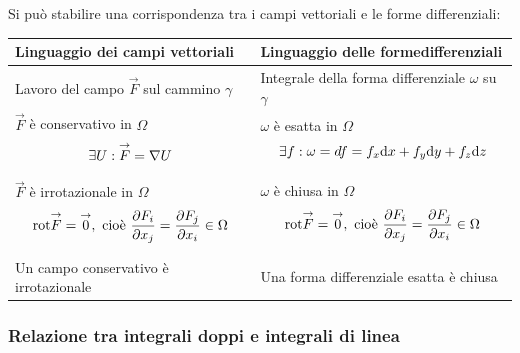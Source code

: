 \documentclass[a4paper]{article}
\begin{document}
	\noindent
	Si può stabilire una corrispondenza tra i campi vettoriali e le forme differenziali:
	\begin{table}[!htp]
		\centering
		\begin{tabular}{@{} p{16em} | p{16em} @{}}
			\toprule
			\textbf{Linguaggio dei campi vettoriali} & \textbf{Linguaggio delle forme}\newline \textbf{differenziali} \\
			\midrule
			Lavoro del campo $\overset{\rightarrow}{F}$ sul cammino $\gamma$ & Integrale della forma differenziale $\omega$ su $\gamma$ \\
			\cmidrule{1-2}
			$\overset{\rightarrow}{F}$ è conservativo in $\Omega$
			\begin{equation*}
				\exists U : \overset{\rightarrow}{F} = \nabla U \vspace{-2em}
			\end{equation*}
			&
			$\omega$ è esatta in $\Omega$
			\begin{equation*}
				\exists f:\omega = df = f_{x}\mathrm{d}x + f_{y}\mathrm{d}y + f_{z}\mathrm{d}z \vspace{-2em}
			\end{equation*} \\
			\cmidrule{1-2}
			$\overset{\rightarrow}{F}$ è irrotazionale in $\Omega$
			\begin{equation*}
				\mathrm{rot} \overset{\rightarrow}{F} = \overset{\rightarrow}{0}, \text{ cioè } \dfrac{\partial F_{i}}{\partial x_{j}} = \dfrac{\partial F_{j}}{\partial x_{i}} \in \Omega \vspace{-1.5em}
			\end{equation*}
			&
			$\omega$ è chiusa in $\Omega$
			\begin{equation*}
				\mathrm{rot} \overset{\rightarrow}{F} = \overset{\rightarrow}{0}, \text{ cioè } \dfrac{\partial F_{i}}{\partial x_{j}} = \dfrac{\partial F_{j}}{\partial x_{i}} \in \Omega \vspace{-1.5em}
			\end{equation*} \\
			\cmidrule{1-2}
			Un campo conservativo è irrotazionale & Una forma differenziale esatta è chiusa \\
			\bottomrule
		\end{tabular}
	\end{table}\newpage

	\subsubsection{Relazione tra integrali doppi e integrali di linea}
	
\end{document}
